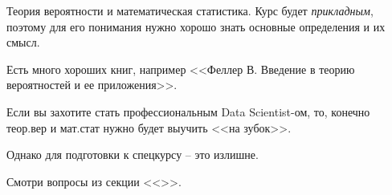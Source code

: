 \documentclass{beamer}
\newcommand{\рис}[1]{рис.\ref{#1}}
\newcommand{\Рис}[1]{Рис.\ref{#1}}
\newcommand{\таблицa}[1]{таблица~№\ref{#1}} %
\newcommand{\таблицы}[1]{таблицы~№\ref{#1}} %
\newcommand{\таблице}[1]{таблице~№\ref{#1}} %
\newcommand{\таблицу}[1]{таблицу~№\ref{#1}} %
\newcommand{\таблицей}[1]{таблицей~№\ref{#1}} %
\newcommand{\Таблицa}[1]{Таблица~№\ref{#1}} %
\newcommand{\Таблицы}[1]{Таблицы~№\ref{#1}} %
\newcommand{\Таблице}[1]{Таблице~№\ref{#1}} %
\newcommand{\Таблицу}[1]{Таблицу~№\ref{#1}} %
\newcommand{\Таблицей}[1]{Таблицей~№\ref{#1}} %
\begin{document}
\begin{frame}{Теория вероятности и математическая статистика.}
Курс будет \textit{прикладным}, поэтому для его понимания 
нужно хорошо знать основные определения и их смысл.

Есть много хороших книг, например 
<<Феллер В. Введение в теорию вероятностей и ее приложения>>.

Если вы захотите стать профессиональным Data Scientist-ом,
то, конечно теор.вер и мат.стат нужно будет выучить <<на зубок>>.

Однако для подготовки к спецкурсу -- это излишне.

Смотри вопросы из секции <<>>.
\end{frame}

   
  
\end{document}

